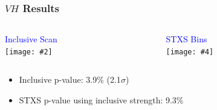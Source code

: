 \documentclass{beamer}
\newcommand{\twofigs}[4]{
  \begin{columns}
    \begin{column}{0.5\linewidth}
      \centering
      \textcolor{blue}{#1} \\
      \texttt{[image: \#2]}
    \end{column}
    \begin{column}{0.5\linewidth}
      \centering
      \textcolor{blue}{#3} \\
      \texttt{[image: \#4]}
    \end{column}
  \end{columns}
}
\begin{document}
\begin{frame}
  \frametitle{$V\!H$ Results}

  \twofigs{Inclusive Scan}
          {figures/210309_incl_unblinded_Xbb_8f854f5a_a866aef8/scan_nominal_r.pdf}
          {STXS Bins}
          {figures/210308_STXSfine_400split_unblinded_Xbb_8f854f5a_a866aef8/summary_stxs.pdf}

  \begin{itemize}
  \item Inclusive p-value: 3.9\% (2.1$\sigma$)
  \item STXS p-value using inclusive strength: 9.3\%
  \end{itemize}

\end{frame}

%
\end{document}
